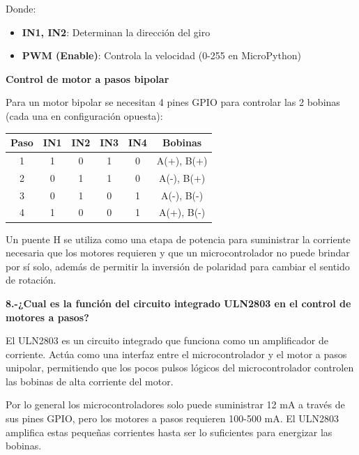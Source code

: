 \documentclass[letterpaper,12pt]{article}
\begin{document}
    Donde:
    \begin{itemize}
        \item \textbf{IN1, IN2}: Determinan la dirección del giro
        \item \textbf{PWM (Enable)}: Controla la velocidad (0-255 en MicroPython)
    \end{itemize}

    \textbf{Control de motor a pasos bipolar}

    Para un motor bipolar se necesitan 4 pines GPIO para controlar las 2 bobinas (cada una en configuración opuesta):

    \begin{center}
        \begin{tabular}{|c|c|c|c|c|c|}
            \hline
            \textbf{Paso} & \textbf{IN1} & \textbf{IN2} & \textbf{IN3} & \textbf{IN4} & \textbf{Bobinas} \\
            \hline
            1 & 1 & 0 & 1 & 0 & A(+), B(+) \\
            \hline
            2 & 0 & 1 & 1 & 0 & A(-), B(+) \\
            \hline
            3 & 0 & 1 & 0 & 1 & A(-), B(-) \\
            \hline
            4 & 1 & 0 & 0 & 1 & A(+), B(-) \\
            \hline
        \end{tabular}
    \end{center}

    Un puente H se utiliza como una etapa de potencia para suministrar la corriente necesaria que los motores requieren y que un microcontrolador no puede brindar por sí solo, además de permitir la inversión de polaridad para cambiar el sentido de rotación. 

    \newpage
    
    \noindent\textbf{8.-¿Cual es la función del circuito integrado ULN2803 en el control de motores a pasos?}

    El ULN2803 es un circuito integrado que funciona como un amplificador de corriente.
    Actúa como una interfaz entre el microcontrolador y el motor a pasos unipolar, permitiendo que los pocos pulsos lógicos del microcontrolador controlen las bobinas de alta corriente del motor.

    Por lo general los microcontroladores solo puede suministrar 12 mA a través de sus pines GPIO, pero los motores a pasos requieren 100-500 mA. 
    El ULN2803 amplifica estas pequeñas corrientes hasta ser lo suficientes para energizar las bobinas.
\end{document}
